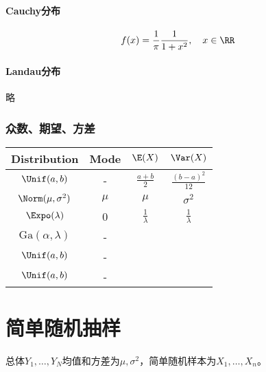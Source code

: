 \paragraph{Cauchy分布}
\begin{align}
	f(x)=\frac1\pi\frac1{1+x^2},\quad x\in\RR
\end{align}
\paragraph{Landau分布}略
\subsubsection{众数、期望、方差}
\begin{center}
	\begin{tabular}{c|c|c|c}
		\toprule
		Distribution&Mode&$\E(X)$&$\Var(X)$\\
		\midrule
		$\Unif(a,b)$&-&$\frac{a+b}2$&$\frac{(b-a)^2}{12}$\\
		\midrule
		$\Norm(\mu,\sigma^2)$&$\mu$&$\mu$&$\sigma^2$\\
		\midrule
		$\Expo(\lambda)$&0&$\frac1\lambda$&$\frac1\lambda$\\
		\midrule
		$\mathrm{Ga}(\alpha,\lambda)$&-&&\\
		\midrule
		$\Unif(a,b)$&-&&\\
		\midrule
		$\Unif(a,b)$&-&&\\
		\bottomrule
	\end{tabular}
\end{center}
\section{简单随机抽样}
总体$Y_1,\ldots,Y_N$均值和方差为$\mu,\sigma^2$，简单随机样本为$X_1,\ldots,X_n$。

